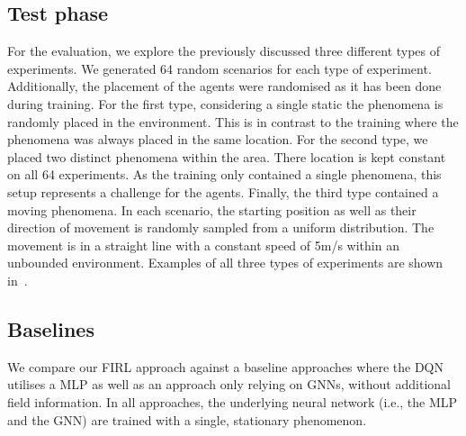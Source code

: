 \documentclass[conference]{IEEEtran}
\begin{document}
\subsection{Test phase}
For the evaluation, 
 we explore the previously discussed three different types of experiments.
%
We generated 64 random scenarios for each type of experiment. Additionally, the placement of the agents were randomised as it has been done during training.
For the first type, considering a single static the phenomena is randomly placed in the environment. This is in contrast to the training where the phenomena was always placed in the same location.  
For the second type, we placed two distinct phenomena within the area. There location is kept constant on all 64 experiments. As the training only contained a single phenomena, this setup represents a challenge for the agents.
Finally, the third type contained a moving phenomena. In each scenario, the starting position as well as their direction of movement is randomly sampled from a uniform distribution. The movement is in a straight line with a constant speed of 5m/s within an unbounded environment. 
%
Examples of all three types of experiments are shown in~. %


\subsection{Baselines}
We compare our \ac{FIRL} approach against a baseline approaches where the \ac{DQN} utilises a \ac{MLP} as well as an approach only relying on \acp{GNN}, without additional field information. 
%
In all approaches, the underlying neural network (i.e., the \ac{MLP} and the \ac{GNN}) are trained %
with a single, stationary phenomenon.
%
\end{document}
